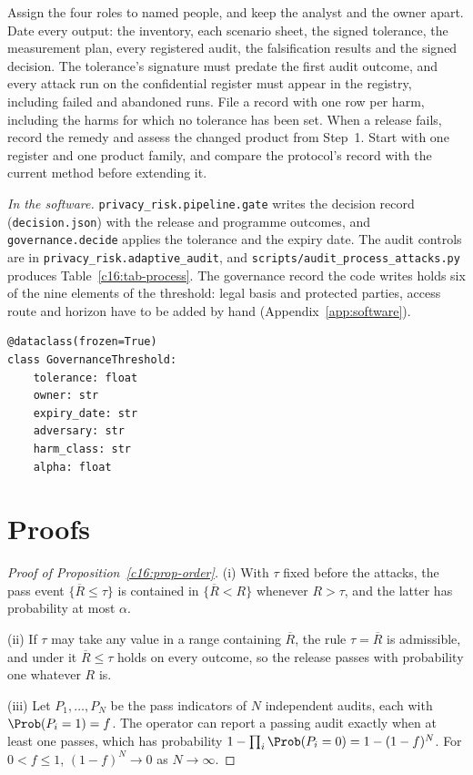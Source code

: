 \begin{inpractice}
\setlength{\emergencystretch}{3em}%
Assign the four roles to named people, and keep the analyst and the owner apart.
Date every output: the inventory, each scenario sheet, the signed tolerance, the
measurement plan, every registered audit, the falsification results and the signed
decision. The tolerance's signature must predate the first audit outcome, and every
attack run on the confidential register must appear in the registry, including
failed and abandoned runs. File a record with one row per harm, including the harms
for which no tolerance has been set. When a release fails, record the remedy and
assess the changed product from Step~1. Start with one register and one product
family, and compare the protocol's record with the current method before extending
it.

\smallskip\noindent\textit{In the software.} \texttt{privacy\_\allowbreak{}risk.\allowbreak{}pipeline.\allowbreak{}gate}
writes the decision record (\texttt{decision.\allowbreak{}json}) with the release and programme
outcomes, and \texttt{governance.\allowbreak{}decide} applies the tolerance and the expiry date.
The audit controls are in \texttt{privacy\_\allowbreak{}risk.\allowbreak{}adaptive\_\allowbreak{}audit}, and
\texttt{scripts/\allowbreak{}audit\_\allowbreak{}process\_\allowbreak{}attacks.\allowbreak{}py} produces Table~\ref{c16:tab-process}. The
governance record the code writes holds six of the nine elements of the threshold:
legal basis and protected parties, access route and horizon have to be added by hand
(Appendix~\ref{app:software}).
\begin{lstlisting}
@dataclass(frozen=True)
class GovernanceThreshold:
    tolerance: float
    owner: str
    expiry_date: str
    adversary: str
    harm_class: str
    alpha: float
\end{lstlisting}
\end{inpractice}

\section{Proofs}

\begin{proof}[Proof of Proposition~\ref{c16:prop-order}]
(i) With $\tau$ fixed before the attacks, the pass event $\{\overline{R} \le \tau\}$ is
contained in $\{\overline{R} < R\}$ whenever $R > \tau$, and the latter has probability
at most $\alpha$.

(ii) If $\tau$ may take any value in a range containing $\overline{R}$, the rule
$\tau = \overline{R}$ is admissible, and under it $\overline{R} \le \tau$ holds on every
outcome, so the release passes with probability one whatever $R$ is.

(iii) Let $P_1,\dots,P_N$ be the pass indicators of $N$ independent audits, each with
$\Prob(P_i = 1) = f$. The operator can report a passing audit exactly when at least
one passes, which has probability $1 - \prod_i \Prob(P_i = 0) = 1 - (1-f)^N$. For
$0 < f \le 1$, $(1-f)^N \to 0$ as $N \to \infty$.
\end{proof}
